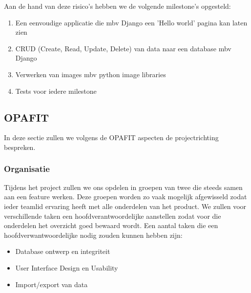Aan de hand van deze risico's hebben we de volgende milestone's opgesteld:
\begin{enumerate}
    \item Een eenvoudige applicatie die mbv Django een 'Hello world' pagina kan laten zien
    \item CRUD (Create, Read, Update, Delete) van data naar een database mbv Django
    \item Verwerken van images mbv python image libraries
    \item Tests voor iedere milestone
\end{enumerate}

\subsection{OPAFIT}

In deze sectie zullen we volgens de OPAFIT aspecten de projectrichting bespreken.

\subsubsection{Organisatie}

Tijdens het project zullen we ons opdelen in groepen van twee die steeds samen aan een feature werken.
Deze groepen worden zo vaak mogelijk afgewisseld zodat ieder teamlid ervaring heeft met alle onderdelen van het product.
We zullen voor verschillende taken een hoofdverantwoordelijke aanstellen zodat voor die onderdelen het overzicht goed bewaard wordt.
Een aantal taken die een hoofdverwantwoordelijke nodig zouden kunnen hebben zijn:
\begin{itemize}
    \item Database ontwerp en integriteit
    \item User Interface Design en Usability
    \item Import/export van data
\end{itemize}

